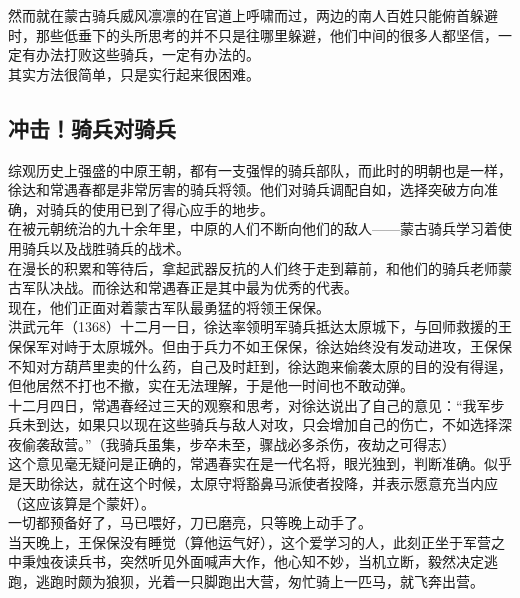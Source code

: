 \begin{multicols}{\theparacolNo}
然而就在蒙古骑兵威风凛凛的在官道上呼啸而过，两边的南人百姓只能俯首躲避时，那些低垂下的头所思考的并不只是往哪里躲避，他们中间的很多人都坚信，一定有办法打败这些骑兵，一定有办法的。\\

其实方法很简单，只是实行起来很困难。\\

\subsection{冲击！骑兵对骑兵}
综观历史上强盛的中原王朝，都有一支强悍的骑兵部队，而此时的明朝也是一样，徐达和常遇春都是非常厉害的骑兵将领。他们对骑兵调配自如，选择突破方向准确，对骑兵的使用已到了得心应手的地步。\\

在被元朝统治的九十余年里，中原的人们不断向他们的敌人——蒙古骑兵学习着使用骑兵以及战胜骑兵的战术。\\

在漫长的积累和等待后，拿起武器反抗的人们终于走到幕前，和他们的骑兵老师蒙古军队决战。而徐达和常遇春正是其中最为优秀的代表。\\

现在，他们正面对着蒙古军队最勇猛的将领王保保。\\

洪武元年（1368）十二月一日，徐达率领明军骑兵抵达太原城下，与回师救援的王保保军对峙于太原城外。但由于兵力不如王保保，徐达始终没有发动进攻，王保保不知对方葫芦里卖的什么药，自己及时赶到，徐达跑来偷袭太原的目的没有得逞，但他居然不打也不撤，实在无法理解，于是他一时间也不敢动弹。\\

十二月四日，常遇春经过三天的观察和思考，对徐达说出了自己的意见：“我军步兵未到达，如果只以现在这些骑兵与敌人对攻，只会增加自己的伤亡，不如选择深夜偷袭敌营。”（我骑兵虽集，步卒未至，骤战必多杀伤，夜劫之可得志）\\

这个意见毫无疑问是正确的，常遇春实在是一代名将，眼光独到，判断准确。似乎是天助徐达，就在这个时候，太原守将豁鼻马派使者投降，并表示愿意充当内应（这应该算是个蒙奸）。\\

一切都预备好了，马已喂好，刀已磨亮，只等晚上动手了。\\

当天晚上，王保保没有睡觉（算他运气好），这个爱学习的人，此刻正坐于军营之中秉烛夜读兵书，突然听见外面喊声大作，他心知不妙，当机立断，毅然决定逃跑，逃跑时颇为狼狈，光着一只脚跑出大营，匆忙骑上一匹马，就飞奔出营。\\


\end{multicols}
